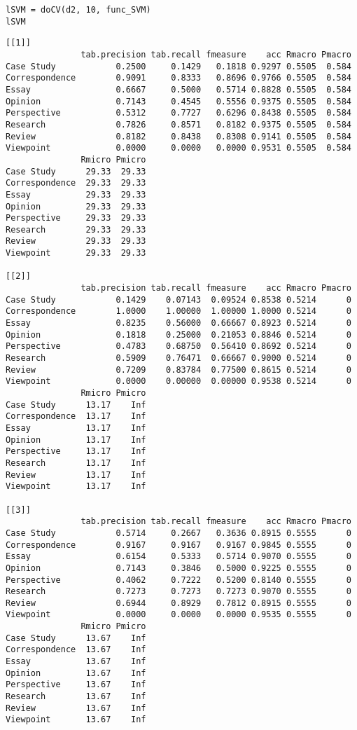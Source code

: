 \documentclass[]{article}
\begin{document}
\begin{lstlisting}[frame=single]
lSVM = doCV(d2, 10, func_SVM)
lSVM
\end{lstlisting}
\begin{lstlisting}[frame=single]
[[1]]
               tab.precision tab.recall fmeasure    acc Rmacro Pmacro
Case Study            0.2500     0.1429   0.1818 0.9297 0.5505  0.584
Correspondence        0.9091     0.8333   0.8696 0.9766 0.5505  0.584
Essay                 0.6667     0.5000   0.5714 0.8828 0.5505  0.584
Opinion               0.7143     0.4545   0.5556 0.9375 0.5505  0.584
Perspective           0.5312     0.7727   0.6296 0.8438 0.5505  0.584
Research              0.7826     0.8571   0.8182 0.9375 0.5505  0.584
Review                0.8182     0.8438   0.8308 0.9141 0.5505  0.584
Viewpoint             0.0000     0.0000   0.0000 0.9531 0.5505  0.584
               Rmicro Pmicro
Case Study      29.33  29.33
Correspondence  29.33  29.33
Essay           29.33  29.33
Opinion         29.33  29.33
Perspective     29.33  29.33
Research        29.33  29.33
Review          29.33  29.33
Viewpoint       29.33  29.33

[[2]]
               tab.precision tab.recall fmeasure    acc Rmacro Pmacro
Case Study            0.1429    0.07143  0.09524 0.8538 0.5214      0
Correspondence        1.0000    1.00000  1.00000 1.0000 0.5214      0
Essay                 0.8235    0.56000  0.66667 0.8923 0.5214      0
Opinion               0.1818    0.25000  0.21053 0.8846 0.5214      0
Perspective           0.4783    0.68750  0.56410 0.8692 0.5214      0
Research              0.5909    0.76471  0.66667 0.9000 0.5214      0
Review                0.7209    0.83784  0.77500 0.8615 0.5214      0
Viewpoint             0.0000    0.00000  0.00000 0.9538 0.5214      0
               Rmicro Pmicro
Case Study      13.17    Inf
Correspondence  13.17    Inf
Essay           13.17    Inf
Opinion         13.17    Inf
Perspective     13.17    Inf
Research        13.17    Inf
Review          13.17    Inf
Viewpoint       13.17    Inf

[[3]]
               tab.precision tab.recall fmeasure    acc Rmacro Pmacro
Case Study            0.5714     0.2667   0.3636 0.8915 0.5555      0
Correspondence        0.9167     0.9167   0.9167 0.9845 0.5555      0
Essay                 0.6154     0.5333   0.5714 0.9070 0.5555      0
Opinion               0.7143     0.3846   0.5000 0.9225 0.5555      0
Perspective           0.4062     0.7222   0.5200 0.8140 0.5555      0
Research              0.7273     0.7273   0.7273 0.9070 0.5555      0
Review                0.6944     0.8929   0.7812 0.8915 0.5555      0
Viewpoint             0.0000     0.0000   0.0000 0.9535 0.5555      0
               Rmicro Pmicro
Case Study      13.67    Inf
Correspondence  13.67    Inf
Essay           13.67    Inf
Opinion         13.67    Inf
Perspective     13.67    Inf
Research        13.67    Inf
Review          13.67    Inf
Viewpoint       13.67    Inf


\end{lstlisting}
\end{document}

